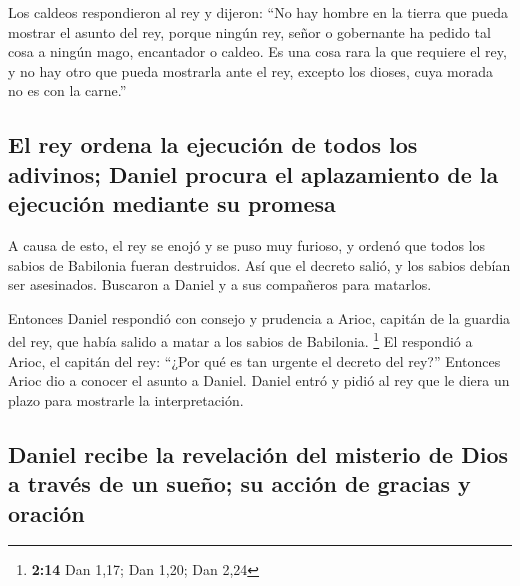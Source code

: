 \begin{paracol}{2}
 Los caldeos respondieron al rey y dijeron: ``No hay
hombre en la tierra que pueda mostrar el asunto del rey, porque ningún
rey, señor o gobernante ha pedido tal cosa a ningún mago, encantador o
caldeo.  Es una cosa rara la que requiere el rey, y no
hay otro que pueda mostrarla ante el rey, excepto los dioses, cuya
morada no es con la carne.''

\hypertarget{el-rey-ordena-la-ejecuciuxf3n-de-todos-los-adivinos-daniel-procura-el-aplazamiento-de-la-ejecuciuxf3n-mediante-su-promesa}{%
\subsection{El rey ordena la ejecución de todos los adivinos; Daniel
procura el aplazamiento de la ejecución mediante su
promesa}\label{el-rey-ordena-la-ejecuciuxf3n-de-todos-los-adivinos-daniel-procura-el-aplazamiento-de-la-ejecuciuxf3n-mediante-su-promesa}}

 A causa de esto, el rey se enojó y se puso muy furioso,
y ordenó que todos los sabios de Babilonia fueran destruidos.
 Así que el decreto salió, y los sabios debían ser
asesinados. Buscaron a Daniel y a sus compañeros para matarlos.

 Entonces Daniel respondió con consejo y prudencia a
Arioc, capitán de la guardia del rey, que había salido a matar a los
sabios de Babilonia. \footnote{\textbf{2:14} Dan 1,17; Dan 1,20; Dan
  2,24}  El respondió a Arioc, el capitán del rey: ``¿Por
qué es tan urgente el decreto del rey?'' Entonces Arioc dio a conocer el
asunto a Daniel.  Daniel entró y pidió al rey que le
diera un plazo para mostrarle la interpretación.

\hypertarget{daniel-recibe-la-revelaciuxf3n-del-misterio-de-dios-a-travuxe9s-de-un-sueuxf1o-su-acciuxf3n-de-gracias-y-oraciuxf3n}{%
\subsection{Daniel recibe la revelación del misterio de Dios a través de
un sueño; su acción de gracias y
oración}\label{daniel-recibe-la-revelaciuxf3n-del-misterio-de-dios-a-travuxe9s-de-un-sueuxf1o-su-acciuxf3n-de-gracias-y-oraciuxf3n}}


\end{paracol}
